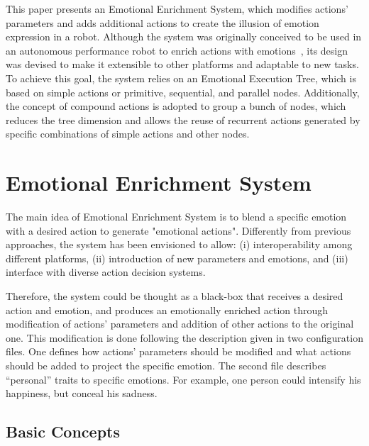 \documentclass{sig-alternate-05-2015}
\begin{document}
This paper presents an Emotional Enrichment System, which modifies actions' parameters and adds additional actions to create the illusion of emotion expression in a robot. Although the system was originally conceived to be used in an autonomous performance robot to enrich actions with emotions~\cite{angel2013}, its design was devised to make it extensible to other platforms and adaptable to new tasks. To achieve this goal, the system relies on an Emotional Execution Tree, which is based on simple actions or primitive, sequential, and parallel nodes. Additionally, the concept of compound actions is adopted to group a bunch of nodes, which reduces the tree dimension and allows the reuse of recurrent actions generated by specific combinations of simple actions and other nodes.

\section{Emotional Enrichment System}

The main idea of Emotional Enrichment System is to blend a specific emotion with a desired action to generate "emotional actions". Differently from previous approaches, the system has been envisioned to allow: (i) interoperability among different platforms, (ii) introduction of new parameters and emotions, and (iii) interface with diverse action decision systems.

Therefore, the system could be thought as a black-box that receives a desired action and emotion, and produces an emotionally enriched action through modification of actions' parameters and addition of other actions to the original one. This modification is done following the description given in two configuration files. One defines how actions' parameters should be modified and what actions should be added to project the specific emotion. The second file describes ``personal'' traits to specific emotions. For example, one person could intensify his happiness, but conceal his sadness. 

\subsection{Basic Concepts}
\end{document}
